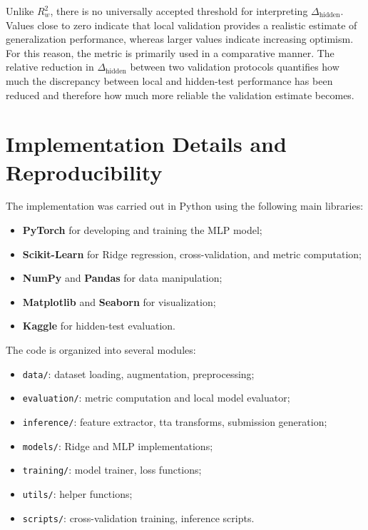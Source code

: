 Unlike $R^2_w$, there is no universally accepted threshold for interpreting $\Delta_{\text{hidden}}$. Values close to zero indicate that local validation provides a realistic estimate of generalization performance, whereas larger values indicate increasing optimism. For this reason, the metric is primarily used in a comparative manner. The relative reduction in $\Delta_{\text{hidden}}$ between two validation protocols quantifies how much the discrepancy between local and hidden-test performance has been reduced and therefore how much more reliable the validation estimate becomes.

\section{Implementation Details and Reproducibility}

The implementation was carried out in Python using the following main libraries:

\begin{itemize}
    \item \textbf{PyTorch} for developing and training the MLP model;
    \item \textbf{Scikit-Learn} for Ridge regression, cross-validation, and metric computation;
    \item \textbf{NumPy} and \textbf{Pandas} for data manipulation;
    \item \textbf{Matplotlib} and \textbf{Seaborn} for visualization;
    \item \textbf{Kaggle} for hidden-test evaluation.
\end{itemize}

The code is organized into several modules:

\begin{itemize}
    \item \texttt{data/}: dataset loading, augmentation, preprocessing;
    \item \texttt{evaluation/}: metric computation and local model evaluator;
    \item \texttt{inference/}: feature extractor, tta transforms, submission generation;
    \item \texttt{models/}: Ridge and MLP implementations;
    \item \texttt{training/}: model trainer, loss functions;
    \item \texttt{utils/}: helper functions;
    \item \texttt{scripts/}: cross-validation training, inference scripts.
\end{itemize}

